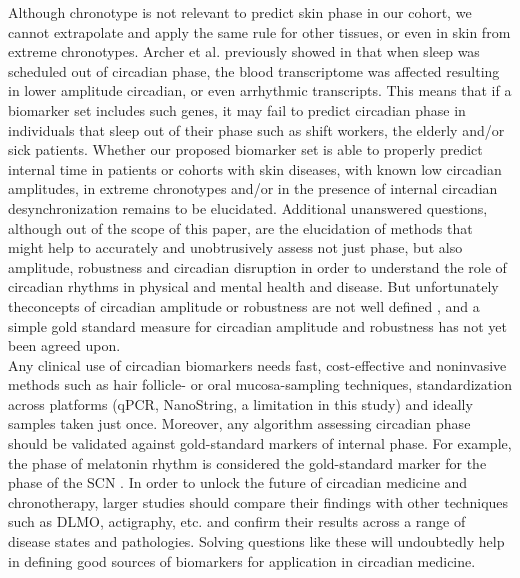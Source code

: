 Although chronotype is not relevant to predict skin phase in our cohort, we cannot extrapolate and apply the same rule for other tissues, or even in skin from extreme chronotypes. Archer et al. previously showed in \cite{Archer2014} that when sleep was scheduled out of circadian phase, the blood transcriptome was affected resulting in lower amplitude circadian, or even arrhythmic transcripts. This means that if a biomarker set includes such genes, it may fail to predict circadian phase in individuals that sleep out of their phase such as shift workers, the elderly and\slash or sick patients. Whether our proposed biomarker set is able to properly predict internal time in patients or cohorts with skin diseases, with known low circadian amplitudes, in extreme chronotypes and\slash or in the presence of internal circadian desynchronization remains to be elucidated. Additional unanswered questions, although out of the scope of this paper, are the elucidation of methods that might help to accurately and unobtrusively assess not just phase, but also amplitude, robustness and circadian disruption in order to understand the role of circadian rhythms in physical and mental health and disease. But unfortunately theconcepts of circadian amplitude or robustness are not well defined \cite{Dijk2020}, and a simple gold standard measure for circadian amplitude and robustness has not yet been agreed upon.\\

Any clinical use of circadian biomarkers needs fast, cost-effective and noninvasive methods such as hair follicle- or oral mucosa-sampling techniques, standardization across platforms (qPCR, NanoString, a limitation in this study) and ideally samples taken just once. Moreover, any algorithm assessing circadian phase should be validated against gold-standard markers of internal phase. For example, the phase of melatonin rhythm is considered the gold-standard marker for the phase of the SCN \cite{Pandi2007, Laing2017}. In order to unlock the future of circadian medicine and chronotherapy, larger studies should compare their findings with other techniques such as DLMO, actigraphy, etc. and confirm their results across a range of disease states and pathologies. Solving questions like these will undoubtedly help in defining good sources of biomarkers for application in circadian medicine. \\ %


